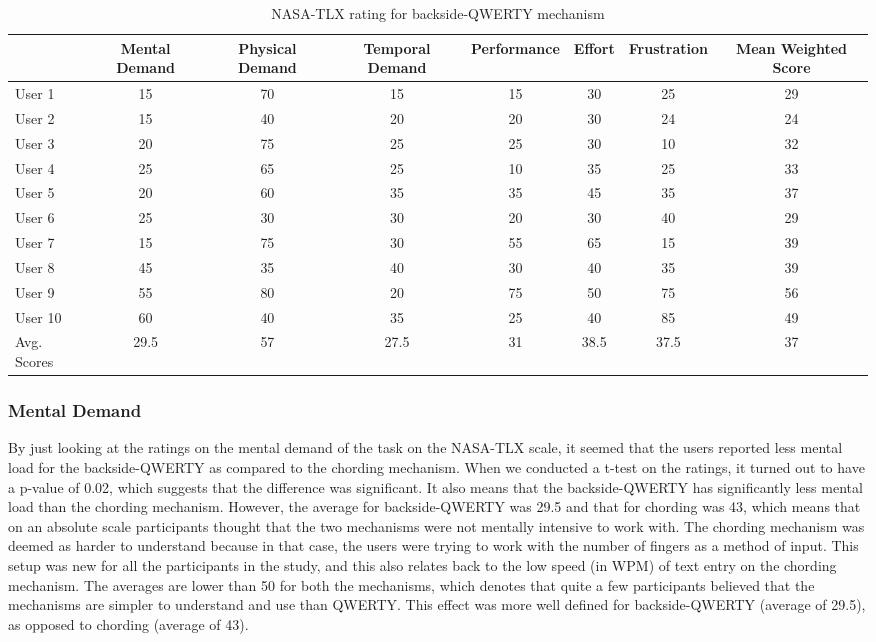 \begin{table*}
	\centering
		\begin{tabular}{|l|c|c|c|c|c|c|c|} \hline
		                         & Mental Demand & Physical Demand & Temporal Demand & Performance & Effort & Frustration & Mean Weighted Score \\ \hline
			 User 1 & 15 & 70 & 15 & 15 & 30 & 25 & 29\\ \hline
			 User 2 & 15 & 40 & 20 & 20 & 30 & 24 & 24\\ \hline
			 User 3 & 20 & 75 & 25 & 25 & 30 & 10 & 32\\ \hline
			 User 4 & 25 & 65 & 25 & 10 & 35 & 25 & 33\\ \hline
			 User 5 & 20 & 60 & 35 & 35 & 45 & 35 & 37\\ \hline
			 User 6 & 25 & 30 & 30 & 20 & 30 & 40 & 29\\ \hline
			 User 7 & 15 & 75 & 30 & 55 & 65 & 15 & 39\\ \hline
			 User 8 & 45 & 35 & 40 & 30 & 40 & 35 & 39\\ \hline
			 User 9 & 55 & 80 & 20 & 75 & 50 & 75 & 56\\ \hline
			 User 10 & 60 & 40 & 35 & 25 & 40 & 85 & 49\\ \hline  
			 Avg. Scores & 29.5 & 57 & 27.5 & 31 & 38.5 & 37.5 & 37\\ \hline
		\end{tabular}
	\caption{NASA-TLX rating for backside-QWERTY mechanism}
	\label{tab:StatisticsForTextCorpora}
\end{table*}	
\subsubsection{Mental Demand}

By just looking at the ratings on the mental demand of the task on the
NASA-TLX scale, it seemed that the users reported less mental load for
the backside-QWERTY as compared to the chording mechanism. When we
conducted a t-test on the ratings, it turned out to have a p-value of
0.02, which suggests that the difference was significant. It also
means that the backside-QWERTY has significantly less mental load than
the chording mechanism. However, the average for backside-QWERTY was
29.5 and that for chording was 43, which means that on an absolute
scale participants thought that the two mechanisms were not mentally
intensive to work with. The chording mechanism was deemed as harder to
understand because in that case, the users were trying to work with
the number of fingers as a method of input. This setup was new for all
the participants in the study, and this also relates back to the low
speed (in WPM) of text entry on the chording mechanism. The averages
are lower than 50 for both the mechanisms, which denotes that quite a
few participants believed that the mechanisms are simpler to
understand and use than QWERTY. This effect was more well defined for
backside-QWERTY (average of 29.5), as opposed to chording (average of
43).

